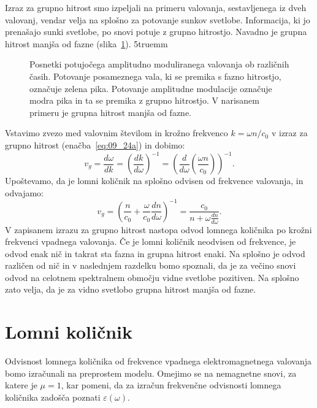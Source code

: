Izraz za grupno hitrost smo izpeljali na primeru valovanja, sestavljenega iz dveh
valovanj, vendar velja na splošno za potovanje sunkov svetlobe. Informacija,
ki jo prenašajo sunki svetlobe, po snovi potuje z grupno hitrostjo. Navadno je grupna hitrost
manjša od fazne (slika~\ref{fig:09_disperzija}).
\vglue5truemm
\begin{figure}[ht]
\centering
\def\svgwidth{130truemm} 

\caption{Posnetki potujočega amplitudno moduliranega valovanja ob različnih časih.
Potovanje posameznega vala, ki se premika s fazno hitrostjo, označuje zelena pika. Potovanje
amplitudne modulacije označuje modra pika in ta se premika z grupno 
hitrostjo. V narisanem primeru je grupna hitrost manjša od fazne.}
\label{fig:09_disperzija}
\end{figure}

Vstavimo zvezo med valovnim številom in krožno frekvenco $k=\omega n /c_0$ v izraz za 
grupno hitrost (enačba~\ref{eq:09_24a}) in dobimo:
\begin{equation}
v_g = \frac{d\omega}{dk } = \left(\frac{dk}{d\omega}\right)^{-1} = \left( \frac{d}{d\omega}\left( 
\frac{\omega n }{c_0}\right)\!\right)^{-1}\!\!.
\label{eq:09_25}
\end{equation}
Upoštevamo, da je lomni količnik na splošno odvisen od frekvence valovanja, in odvajamo:
\begin{equation}
v_g = \left(\frac{n}{c_0} + \frac{\omega}{c_0 }\frac{dn}{d\omega}\right)^{-1} = 
\frac{c_0}{n+\omega \frac{dn}{d\omega}}.
\label{eq:09_26}
\end{equation}
V zapisanem izrazu za grupno hitrost nastopa odvod lomnega količnika po krožni frekvenci vpadnega
valovanja. Če je lomni količnik neodvisen od frekvence, je odvod enak nič in 
takrat sta fazna in grupna hitrost enaki. Na splošno je odvod različen od nič in v naslednjem razdelku bomo
spoznali, da je za večino snovi odvod na celotnem spektralnem območju vidne svetlobe pozitiven.
Na splošno zato velja, da je za vidno svetlobo grupna hitrost manjša od fazne.

\section{Lomni količnik}
\label{chap:lomni}
Odvisnost lomnega količnika od frekvence vpadnega 
elektromagnetnega valovanja bomo izračunali na preprostem modelu. 
Omejimo se na nemagnetne snovi, za katere je $\mu = 1$, kar pomeni, da
za izračun frekvenčne odvisnosti lomnega količnika zadošča poznati 
$\varepsilon(\omega)$. 

